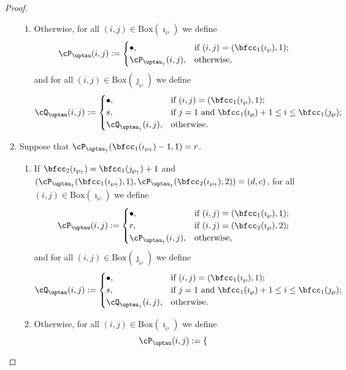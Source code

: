 \documentclass[12pt]{amsart}
\numberwithin{equation}{section}
\theoremstyle{remark}
\def\BOX#1{\mathrm{Box}(#1)}
\def\wpu{\wp_{\uparrow}}
\def\wpd{\wp} %
\def\uptauu{\uptau_{\uparrow}}
\def\uptaud{\uptau} %
\begin{document}
\begin{proof}
\begin{enumerate}[label=(\alph*)]
\begin{enumerate}[label={\localtextbulletone}]
     \item Otherwise, for all $(i,j)\in \BOX{\imath_{\wpd}}$ we define
     \[
       \cP_{\uptaud}(i,j) := \begin{cases}
         \bullet ,& \text{if $(i,j)=(\bfcc_{1}(\imath_{\wpd}),1)$};\\
         \cP_{\uptauu}(i,j) ,&\text{otherwise},
       \end{cases}
     \]
     and for all $(i,j)\in \BOX{\jmath_{\wpd}}$ we define
     \[
       \cQ_{\uptaud}(i,j) := \begin{cases}
         \bullet ,& \text{if $(i,j)=(\bfcc_{1}(\imath_{\wpd}),1)$};\\
         s ,& \text{if $j=1$ and $\bfcc_{1}(\imath_{\wpd})+1\leq i \leq \bfcc_{1}(\jmath_{\wpd})$};\\
         \cQ_{\uptauu}(i,j) ,&\text{otherwise}.
       \end{cases}
     \]
   \end{enumerate}
   \item Suppose that $\cP_{\uptauu}(\bfcc_{1}(\imath_{\wpu})-1,1)=r$.
   \begin{enumerate}[label={\localtextbulletone}]
     \item If $\bfcc_{2}(\imath_{\wpu}) = \bfcc_{1}(\jmath_{\wpu})+1$
     and
     $(\cP_{\uptauu}(\bfcc_{1}(\imath_{\wpu}),1), \cP_{\uptauu}(\bfcc_{2}(\imath_{\wpu}),2) ) = (d,c)$,
         for all $(i,j)\in \BOX{\imath_{\wpd}}$  we define
     \[
       \cP_{\uptaud}(i,j) := \begin{cases}
         \bullet ,& \text{if $(i,j)=(\bfcc_{1}(\imath_{\wpd}),1)$};\\
         r ,& \text{if $(i,j)=(\bfcc_{2}(\imath_{\wpd}),2)$};\\
         \cP_{\uptauu}(i,j) ,&\text{otherwise},
       \end{cases}
     \]
     and  for all $(i,j)\in \BOX{\jmath_{\wpd}}$  we define
     \[
       \cQ_{\uptaud}(i,j) := \begin{cases}
         \bullet ,& \text{if $(i,j)=(\bfcc_{1}(\imath_{\wpd}),1)$};\\
         s ,& \text{if $j=1$ and $\bfcc_{1}(\imath_{\wpd})+1\leq i \leq \bfcc_{1}(\jmath_{\wpd})$};\\
         \cQ_{\uptauu}(i,j), &\text{otherwise}.
       \end{cases}
     \]
     \item Otherwise,
         for all $(i,j)\in \BOX{\imath_{\wpd}}$  we define
     \[
       \cP_{\uptaud}(i,j) := \begin{cases}

\end{cases}\]
\end{enumerate}
\end{enumerate}
\end{proof}
\end{document}
